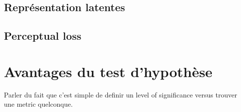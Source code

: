 \subsection{Représentation latentes}



\subsection{Perceptual loss}

\section{Avantages du test d'hypothèse}

Parler du fait que c'est simple de definir un level of significance versus trouver une metric quelconque.